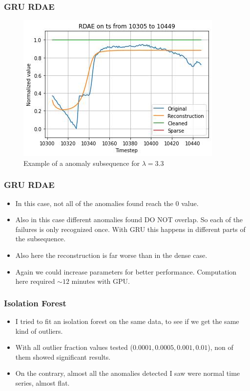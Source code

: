 \documentclass{beamer}
\theoremstyle{plain}
\theoremstyle{definition}
\theoremstyle{remark}
\begin{document}
\begin{frame}
	\frametitle{GRU RDAE}
	\begin{figure}
		\centering
		\includegraphics[width=0.7\linewidth]{Images/GRUlam3.3ts_anomalyzoom10305.jpg}
		\caption[]{Example of a anomaly subsequence for $\lambda=3.3$}
	\end{figure}
\end{frame}

\begin{frame}
	\frametitle{GRU RDAE}
	\begin{itemize}
		\item In this case, not all of the anomalies found reach the $0$ value.
		\item Also in this case different anomalies found DO NOT overlap. So each of the failures is only recognized once. With GRU this happens in different parts of the subsequence.
		\item Also here the reconstruction is far worse than in the dense case.
		\item Again we could increase parameters for better performance. Computation here required $\sim 12$ minutes with GPU.
	\end{itemize}
\end{frame}

\begin{frame}
	\frametitle{Isolation Forest}
	\begin{itemize}
		\item I tried to fit an isolation forest on the same data, to see if we get the same kind of outliers.
		\item With all outlier fraction values tested ($0.0001, 0.0005, 0.001, 0.01$), non of them showed significant results.
		\item On the contrary, almost all the anomalies detected I saw were normal time series, almost flat.
	\end{itemize}
\end{frame}
\end{document}
